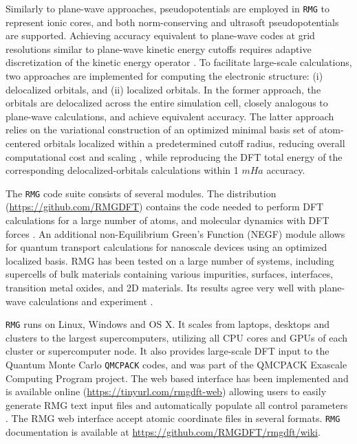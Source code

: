 \documentclass[journal=jctcce,manuscript=article,etalmode=truncate,maxauthors=10,layout=twocolumn,9pt]{achemso}   %
\begin{document}
Similarly to plane-wave approaches, pseudopotentials are employed in \texttt{RMG} to represent ionic cores, and both norm-conserving \cite{Hamann,BHS,KleinmanBylander} and ultrasoft \cite{Vanderbilt} pseudopotentials are supported. Achieving accuracy equivalent to plane-wave codes at grid resolutions similar to plane-wave kinetic energy cutoffs requires adaptive discretization of the kinetic energy operator \cite{rmg-dft-2024}. To facilitate large-scale calculations, two approaches are implemented for computing the electronic structure: (i) delocalized orbitals, and (ii) localized orbitals. In the former approach, the orbitals are delocalized across the entire simulation cell, closely analogous to plane-wave calculations, and achieve equivalent accuracy. The latter approach relies on the variational construction of an optimized minimal basis set of atom-centered orbitals localized within a predetermined cutoff radius, reducing overall computational cost and scaling \cite{fatt-bern,fattebert}, while reproducing the DFT total energy of the corresponding delocalized-orbitals calculations within 1 $mHa$ accuracy.


The \texttt{RMG} code suite consists of several modules. The  distribution (\url{https://github.com/RMGDFT}) contains the code needed to perform DFT calculations for a large number of atoms, and molecular dynamics with DFT forces \cite{RMG-DFT-github}. An additional non-Equilibrium Green's Function (NEGF) module allows for quantum transport calculations\cite{Lu_PRL-2005} for nanoscale devices using an optimized localized basis. 
RMG has been tested on a large number of systems, including supercells of bulk materials containing various impurities, surfaces,  interfaces, transition metal oxides, and 2D materials. Its results agree very well with plane-wave calculations and experiment \cite{briggs1996,rmg-dft-2024}. 

\texttt{RMG} runs on Linux, Windows and OS X. It scales from laptops, desktops and clusters to the largest supercomputers, utilizing all CPU cores and GPUs of each cluster or supercomputer node. It also provides large-scale DFT input to the Quantum Monte Carlo \texttt{QMCPACK} codes,\cite{qmcpack1,qmcpack2} and was part of the QMCPACK Exascale Computing Program project.\cite{exascale} 
The web based  interface has been implemented and is available online (\url{https://tinyurl.com/rmgdft-web}) allowing users to easily generate RMG text input files and automatically populate all control parameters \cite{RMG-DFT-gui}.
The  RMG web interface accept atomic coordinate files in several formats. 
\texttt{RMG} documentation is available at \url{https://github.com/RMGDFT/rmgdft/wiki}.
\end{document}

